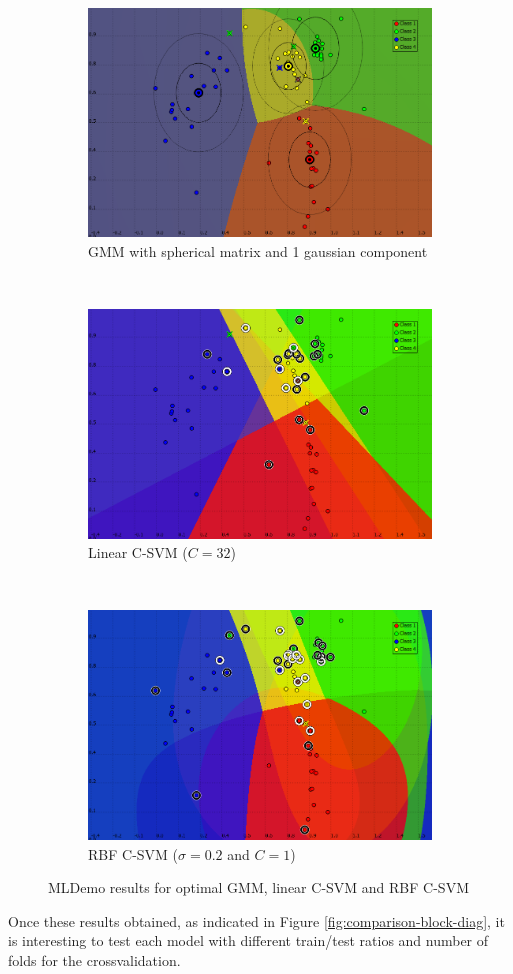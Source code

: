 \documentclass[a4paper,10pt]{article}
\begin{document}
\begin{figure}[H]
\centering
     \begin{subfigure}[t]{0.3\textwidth} 
      \centering
      \includegraphics[height= 3.2 cm]{pictures/classification-best-GMM-SPH-C1.png}
      \caption{GMM with spherical matrix and 1 gaussian component}
      \label{fig:classification-best-GMM}
     \end{subfigure}
      ~
    \begin{subfigure}[t]{0.3\textwidth} 
      \centering
      \includegraphics[height= 3.2 cm]{pictures/classification-best-CSVM-C32.png}
      \caption{Linear C-SVM ($C=32$)}
      \label{fig:classification-best-lin-CSVM}
     \end{subfigure}
     ~
    \begin{subfigure}[t]{0.3\textwidth} 
      \centering
      \includegraphics[height= 3.2 cm]{pictures/classification-best-CSVM-C1-S02.png}
      \caption{RBF C-SVM ($\sigma = 0.2$ and $C=1$)}
      \label{fig:classification-best-RBFCSVM}
     \end{subfigure}
    \caption{MLDemo results for optimal GMM, linear C-SVM and RBF C-SVM}
    \label{fig:best-plots}

\end{figure}


Once these results obtained, as indicated in Figure \ref{fig:comparison-block-diag}, it is interesting to test each model with different train/test ratios and number of folds for the crossvalidation.\\
\end{document}
